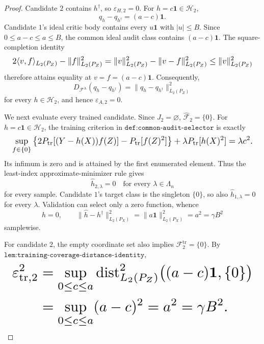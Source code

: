 \documentclass{article}
\begin{document}
\begin{proof}
Candidate \(2\) contains \(h^\dagger\), so \(\varepsilon_{H,2}=0\). For \(h=c\mathbf 1\in\mathcal H_2\),
\[
 q_h-q_{h^\dagger}=(a-c)\mathbf 1.
\]
Candidate \(1\)'s ideal critic body contains every \(u\mathbf 1\) with \(|u|\le B\). Since \(0\le a-c\le a\le B\), the common ideal audit class contains \((a-c)\mathbf 1\). The square-completion identity
\[
\makebox[\linewidth][c]{\resizebox{0.98\linewidth}{!}{\(\displaystyle 2\langle v,f\rangle_{L_2(P_Z)}-\|f\|_{L_2(P_Z)}^2
 =\|v\|_{L_2(P_Z)}^2-\|v-f\|_{L_2(P_Z)}^2
 \le \|v\|_{L_2(P_Z)}^2\)}}
\]
therefore attains equality at \(v=f=(a-c)\mathbf 1\). Consequently,
\[
 D_{\mathcal F^{\mathrm A}}(q_h-q_{h^\dagger})
 =\|q_h-q_{h^\dagger}\|_{L_2(P_Z)}^2
\]
for every \(h\in\mathcal H_2\), and hence \(\varepsilon_{A,2}=0\).

We next evaluate every trained candidate. Since \(J_2=\varnothing\), \(\widehat{\mathcal F}_2=\{0\}\). For \(h=c\mathbf 1\in\mathcal H_2\), the training criterion in \(\texttt{def:common-audit-selector}\) is exactly
\[
\makebox[\linewidth][c]{\resizebox{0.98\linewidth}{!}{\(\displaystyle \sup_{f\in\{0\}}
 \left\{2P_{\mathrm{tr}}[(Y-h(X))f(Z)]-P_{\mathrm{tr}}[f(Z)^2]\right\}
 +\lambda P_{\mathrm{tr}}[h(X)^2]
 =\lambda c^2.\)}}
\]
Its infimum is zero and is attained by the first enumerated element. Thus the least-index approximate-minimizer rule gives
\[
 \widehat h_{2,\lambda}=0
 \quad\text{for every }\lambda\in\Lambda_n
\]
for every sample. Candidate \(1\)'s target class is the singleton \(\{0\}\), so also \(\widehat h_{1,\lambda}=0\) for every \(\lambda\). Validation can select only a zero function, whence
\[
 \widehat h=0,
 \qquad
 \|\widehat h-h^\dagger\|_{L_2(P_X)}^2
 =\|a\mathbf 1\|_{L_2(P_X)}^2
 =a^2
 =\gamma B^2
\]
samplewise.

For candidate \(2\), the empty coordinate set also implies \(\mathcal F_2^{\mathrm{tr}}=\{0\}\). By \(\texttt{lem:training-coverage-distance-identity}\),
\[
\makebox[\linewidth][c]{\resizebox{0.98\linewidth}{!}{\(\displaystyle \begin{aligned}
 \varepsilon_{\mathrm{tr},2}^2
 &=\sup_{0\le c\le a}
 \operatorname{dist}_{L_2(P_Z)}^2\bigl((a-c)\mathbf 1,\{0\}\bigr)\\
 &=\sup_{0\le c\le a}(a-c)^2
 =a^2
 =\gamma B^2.
 \end{aligned}\)}}
\]


\end{proof}
\end{document}
